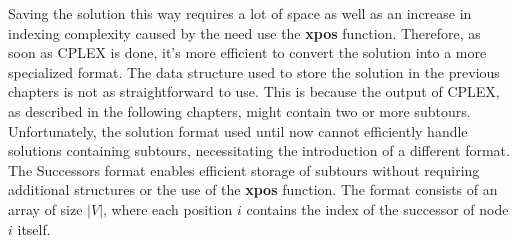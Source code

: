 Saving the solution this way requires a lot of space as well as an increase in indexing complexity caused by the need use the \textbf{xpos} function.
Therefore, as soon as CPLEX is done, it's more efficient to convert the solution into a more specialized format.
The data structure used to store the solution in the previous chapters is not as straightforward to use.
This is because the output of CPLEX, as described in the following chapters, might contain two or more subtours.
Unfortunately, the solution format used until now cannot efficiently handle solutions containing subtours, necessitating the introduction of a different format.
The Successors format enables efficient storage of subtours without requiring additional structures or the use of the \textbf{xpos} function.
The format consists of an array of size $|V|$, where each position $i$ contains the index of the successor of node $i$ itself.

